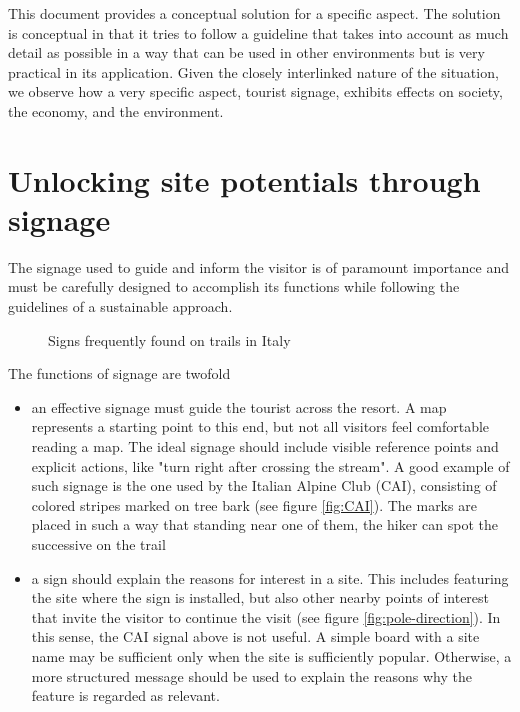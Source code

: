 \documentclass[sustainability,article,submit,pdftex,moreauthors]{Definitions/mdpi}
\begin{document}
This document provides a conceptual solution for a specific aspect. The solution is conceptual in that it tries to follow a guideline that takes into account as much detail as possible in a way that can be used in other environments but is very practical in its application. Given the closely interlinked nature of the situation, we observe how a very specific aspect, tourist signage, exhibits effects on society, the economy, and the environment.

\section{Unlocking site potentials through signage \label{sec:signage}}

The signage used to guide and inform the visitor is of paramount importance and must be carefully designed to accomplish its functions while following the guidelines of a sustainable approach.

\begin{figure}
\hfill
{}
\caption{Signs frequently found on trails in Italy}
\label{fig:traditional}
\end{figure}

The functions of signage are twofold
\begin {itemize}
\item an effective signage must guide the tourist across the resort. A map represents a starting point to this end, but not all visitors feel comfortable reading a map. The ideal signage should include visible reference points and explicit actions, like "turn right after crossing the stream". A good example of such signage is the one used by the Italian Alpine Club (CAI), consisting of colored stripes marked on tree bark (see figure \ref{fig:CAI}). The marks are placed in such a way that standing near one of them, the hiker can spot the successive on the trail
\item a sign should explain the reasons for interest in a site. This includes featuring the site where the sign is installed, but also other nearby points of interest that invite the visitor to continue the visit (see figure \ref{fig:pole-direction}). In this sense, the CAI signal above is not useful. A simple board with a site name may be sufficient only when the site is sufficiently popular. Otherwise, a more structured message should be used to explain the reasons why the feature is regarded as relevant.
\end{itemize}
\end{document}
